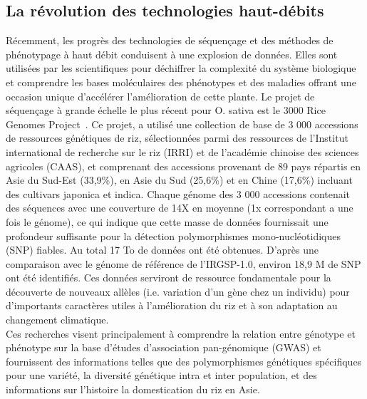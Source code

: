 \subsection{La révolution des technologies haut-débits}
Récemment, les progrès des technologies de séquençage et des méthodes de phénotypage à haut débit conduisent à une explosion de données. Elles sont utilisées par les scientifiques pour déchiffrer la complexité du système biologique et comprendre les bases moléculaires des phénotypes et des maladies offrant une occasion unique d’accélérer l’amélioration de cette plante. Le projet de séquençage à grande échelle le plus récent pour O. sativa est le 3000 Rice Genomes Project~\cite{3KRG_2018}. Ce projet, a utilisé une collection de base de 3 000 accessions de ressources génétiques de riz, sélectionnées parmi des ressources de l'Institut international de recherche sur le riz (IRRI) et de l'académie chinoise des sciences agricoles (CAAS), et comprenant des accessions provenant de 89 pays répartis en Asie du Sud-Est (33,9\%), en Asie du Sud (25,6\%) et en Chine (17,6\%) incluant des cultivars japonica et indica. Chaque génome des 3 000 accessions contenait des séquences avec une couverture de 14X en moyenne (1x correspondant a une fois le génome), ce qui indique que cette masse de données fournissait une profondeur suffisante pour la détection polymorphismes mono-nucléotidiques (SNP) fiables. Au total 17 To de données ont été obtenues. D'après une comparaison avec le génome de référence de l'IRGSP-1.0, environ 18,9 M de SNP ont été identifiés. Ces données serviront de ressource fondamentale pour la découverte de nouveaux allèles (i.e. variation d'un gène chez un individu) pour d'importants caractères utiles à l'amélioration du riz et à son adaptation au changement climatique. \\ 

Ces recherches visent principalement à comprendre la relation entre génotype et phénotype sur la base d'études d'association pan-génomique (GWAS) et fournissent des informations telles que des polymorphismes génétiques spécifiques pour une variété, la diversité génétique intra et inter population, et des informations sur l'histoire la domestication du riz en Asie.\\

